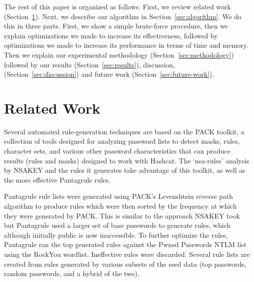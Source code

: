 \documentclass[letterpaper,twocolumn,10pt]{article}
\begin{document}
The rest of this paper is organized as follows. First, we review related work
(Section~\ref{sec:related-work}). Next, we describe our algorithm in
Section~\ref{sec:algorithm}. We do this in three parts. First, we show a
simple brute-force procedure, then we explain optimizations we made to increase
its effectiveness, followed by optimizations we made to increase its
performance in terms of time and memory. Then we explain our experimental
methodology (Section~\ref{sec:methodology}) followed by our results
(Section~\ref{sec:results}), discussion, (Section~\ref{sec:discussion}) and
future work (Section~\ref{sec:future-work}).




\section{Related Work}
\label{sec:related-work}

Several automated rule-generation techniques are based
on the PACK toolkit\cite{PACK}, a collection of tools designed for analyzing
password lists to detect masks, rules, character sets, and various other
password characteristics that can produce results (rules and masks) designed to
work with Hashcat. The `nsa-rules' analysis by NSAKEY\cite{NSAKEY} and the
rules it generates take advantage of this toolkit, as well as the more
effective Pantagrule rules\cite{pantagrule}.

Pantagrule rule lists were generated using PACK's Levenshtein reverse path
algorithm to produce rules which were then sorted by the frequency at which
they were generated by PACK. This is similar to the approach NSAKEY took but
Pantagrule used a larger set of base passwords to generate rules, which
although initially public is now inaccessible. To further optimize the rules,
Pantagrule ran the top generated rules against the Pwned Passwords NTLM
list\cite{pwned} using the RockYou wordlist. Ineffective rules were discarded.
Several rule lists are created from rules generated by various subsets of the
seed data (top passwords, random passwords, and a hybrid of the two).
\end{document}
